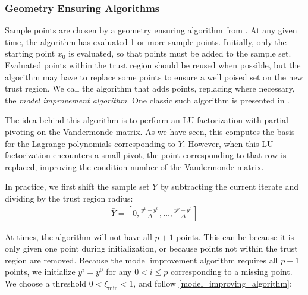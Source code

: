 \documentclass{article}
\theoremstyle{case}
\numberwithin{theorem}{subsection}
\newcommand{\ximin}{\xi_{\text{min}}}
\begin{document}
\subsubsection{Geometry Ensuring Algorithms}

Sample points are chosen by a geometry ensuring algorithm from \cite{DUMMY:intro_book}.
At any given time, the algorithm has evaluated 1 or more sample points.
Initially, only the starting point $x_0$ is evaluated, so that points must be added to the sample set.
Evaluated points within the trust region should be reused when possible, but the algorithm may have to replace some points to ensure a well poised set on the new trust region.
We call the algorithm that adds points, replacing where necessary, the \emph{model improvement algorithm}.
One classic such algorithm is presented in \cite{DUMMY:intro_book}.

The idea behind this algorithm is to perform an LU factorization with partial pivoting on the Vandermonde matrix.
As we have seen, this computes the basis for the Lagrange polynomials corresponding to $Y$.
However, when this LU factorization encounters a small pivot, the point corresponding to that row is replaced, improving the condition number of the Vandermonde matrix.

In practice, we first shift the sample set $Y$ by subtracting the current iterate and dividing by the trust region radius:
\begin{align}
\bar{Y} = [0, \frac{y^1 - y^0}{\Delta}, \ldots, \frac{y^p - y^0}{\Delta}]
\end{align}

At times, the algorithm will not have all $p+1$ points.
This can be because it is only given one point during initialization, or because points not within the trust region are removed.
Because the model improvement algorithm requires all $p+1$ points, we initialize $y^i = y^0$ for any $0 < i \le p$ corresponding to a missing point.
We choose a threshold $0 < \ximin < 1$, and follow \cref{model_improving_algorithm}:
\end{document}
